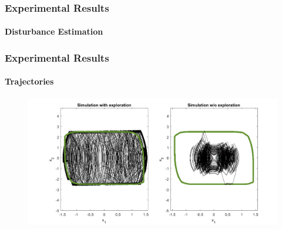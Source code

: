 \documentclass[t]{beamer}
\begin{document}
\begin{frame}
\frametitle{Experimental Results}
\framesubtitle{Disturbance Estimation}

\begin{figure}[width=\paperwidth]
\end{figure}
\end{frame}

\begin{frame}
\frametitle{Experimental Results}
\framesubtitle{Trajectories}
\begin{figure}
\includegraphics[width=0.8\paperwidth]{Simulation}
\end{figure}
\end{frame}
\end{document}
